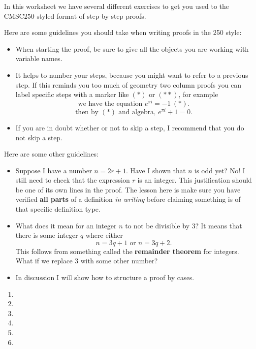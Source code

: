 
In this worksheet we have several different exercises to get you used to the CMSC250 styled format of step-by-step proofs.

Here are some guidelines you should take when writing proofs in the 250 style:
\begin{itemize}
    \item When starting the proof, be sure to give all the objects you are working with variable names.
    \item It helps to number your steps, because you might want to refer to a previous step. If this reminds you too much of geometry two column proofs you can label specific steps with a marker like $(*)$ or $(**)$, for example
    \[\text{we have the equation }e^{\pi i} = -1~(*).\]
    \[\text{then by $(*)$ and algebra, $e^{\pi i} + 1 = 0$}.\]
    \item If you are in doubt whether or not to skip a step, I recommend that you do not skip a step.
\end{itemize}

Here are some other guidelines:
\begin{itemize}
    \item Suppose I have a number $n = 2r + 1$. Have I shown that $n$ is odd yet? No! I still need to check that the expression $r$ is an integer. This justification should be one of its own lines in the proof. The lesson here is make sure you have verified \textbf{all parts} of a definition \textit{in writing} before claiming something is of that specific definition type.
    \item What does it mean for an integer $n$ to not be divisible by $3$? It means that there is some integer $q$ where either
    \[n = 3q + 1 \text{ or } n = 3q + 2.\]
    This follows from something called the \textbf{remainder theorem} for integers. What if we replace $3$ with some other number?
    \item In discussion I will show how to structure a proof by cases.
\end{itemize}
 \begin{enumerate}
   \item 
   \item 
   \item 
   \item 
   \item 
   \item 
 \end{enumerate}

